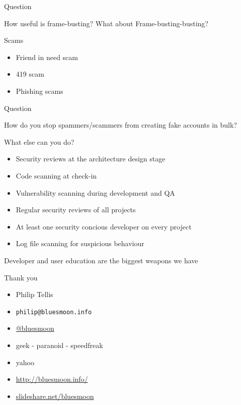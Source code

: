 \documentclass{beamer}
\begin{document}
\begin{frame}{Question}
\begin{center}
How useful is frame-busting?  What about Frame-busting-busting?
\end{center}
\end{frame}

\begin{frame}{Scams}
\begin{itemize}
\item Friend in need scam
\item 419 scam
\item Phishing scams
\end{itemize}
\end{frame}

\begin{frame}{Question}
\begin{center}
How do you stop spammers/scammers from creating fake accounts in bulk?
\end{center}
\end{frame}

\begin{frame}{What else can you do?}
\begin{itemize}
\item Security reviews at the architecture design stage
\item Code scanning at check-in
\item Vulnerability scanning during development and QA
\item Regular security reviews of all projects
\item At least one security concious developer on every project
\item Log file scanning for suspicious behaviour
\end{itemize}
\end{frame}

\begin{frame}{}
\begin{center}
Developer and user education are the biggest weapons we have
\end{center}
\end{frame}

\begin{frame}{Thank you}
  \begin{itemize}
  \item Philip Tellis
  \item \small{\texttt{philip@bluesmoon.info}}
  \item \href{http://twitter.com/bluesmoon}{@bluesmoon}
  \item geek - paranoid - speedfreak
  \item yahoo
  \item \href{http://bluesmoon.info/}{http://bluesmoon.info/}
  \item \href{http://www.slideshare.net/bluesmoon}{slideshare.net/bluesmoon}
  \end{itemize}
\end{frame}
\end{document}
